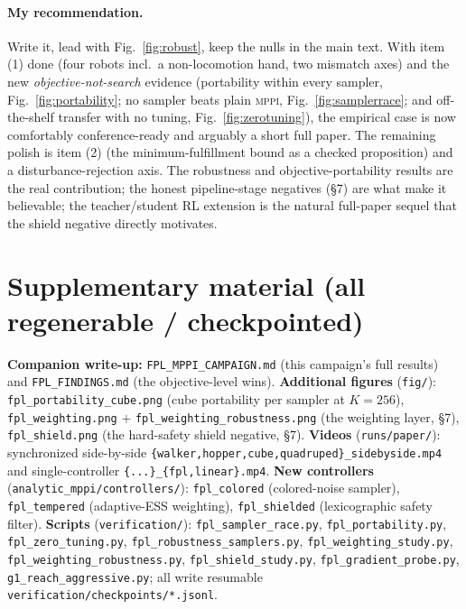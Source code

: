 \documentclass[11pt]{article}
\newcommand{\mppi}{\textsc{mppi}}
\begin{document}
\paragraph{My recommendation.} Write it, lead with Fig.~\ref{fig:robust}, keep the nulls in
the main text. With item (1) done (four robots incl.\ a non-locomotion hand, two mismatch axes) and
the new \emph{objective-not-search} evidence (portability within every sampler,
Fig.~\ref{fig:portability}; no sampler beats plain \mppi, Fig.~\ref{fig:samplerrace}; and
off-the-shelf transfer with no tuning, Fig.~\ref{fig:zerotuning}), the empirical case is now
comfortably conference-ready and arguably a short full paper. The remaining polish is item (2) (the
minimum-fulfillment bound as a checked proposition) and a disturbance-rejection axis. The robustness
and objective-portability results are the real contribution; the honest pipeline-stage negatives
(\S7) are what make it believable; the teacher/student RL extension is the natural full-paper
sequel that the shield negative directly motivates.

\appendix
\section{Supplementary material (all regenerable / checkpointed)}
\textbf{Companion write-up:} \texttt{FPL\_MPPI\_CAMPAIGN.md} (this campaign's full results) and
\texttt{FPL\_FINDINGS.md} (the objective-level wins). \textbf{Additional figures}
(\texttt{fig/}): \texttt{fpl\_portability\_cube.png} (cube portability per sampler at
$K{=}256$), \texttt{fpl\_weighting.png} $+$ \texttt{fpl\_weighting\_robustness.png} (the weighting
layer, \S7), \texttt{fpl\_shield.png} (the hard-safety shield negative, \S7).
\textbf{Videos} (\texttt{runs/paper/}): synchronized side-by-side
\texttt{\{walker,hopper,cube,quadruped\}\_sidebyside.mp4} and single-controller
\texttt{\{...\}\_\{fpl,linear\}.mp4}. \textbf{New controllers} (\texttt{analytic\_mppi/controllers/}):
\texttt{fpl\_colored} (colored-noise sampler), \texttt{fpl\_tempered} (adaptive-ESS weighting),
\texttt{fpl\_shielded} (lexicographic safety filter). \textbf{Scripts} (\texttt{verification/}):
\texttt{fpl\_sampler\_race.py}, \texttt{fpl\_portability.py}, \texttt{fpl\_zero\_tuning.py},
\texttt{fpl\_robustness\_samplers.py}, \texttt{fpl\_weighting\_study.py},
\texttt{fpl\_weighting\_robustness.py}, \texttt{fpl\_shield\_study.py},
\texttt{fpl\_gradient\_probe.py}, \texttt{g1\_reach\_aggressive.py}; all write resumable
\texttt{verification/checkpoints/*.jsonl}.
\end{document}
